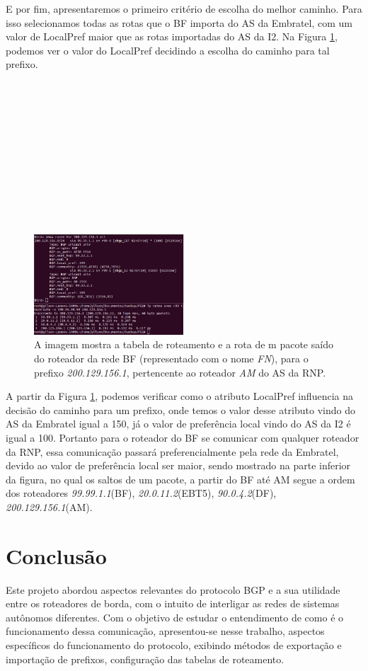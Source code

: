 \documentclass[12pt,a4paper]{report}
\begin{document}
E por fim, apresentaremos o primeiro crit\'erio de escolha do melhor caminho. Para isso selecionamos todas as rotas que o BF importa do AS da Embratel, com um valor de LocalPref maior que as rotas importadas do AS da I2. Na Figura \ref{fig:imagem12}, podemos ver o valor do LocalPref decidindo a escolha do caminho para tal prefixo.
\\
\\
\\
\\
\\
\\
\\
\\
\\
\\
\\
\\
\begin{figure}[!htb]
 \centering
 \includegraphics[width=0.5\textwidth]{Imagens/figura65}
  \caption{\label{fig:imagem12} A imagem mostra a tabela de roteamento e a rota de m pacote sa\'ido do roteador da rede BF (representado com o nome \textit{FN}), para o prefixo \textit{200.129.156.1}, pertencente ao roteador \textit{AM} do AS da RNP.}

\end{figure}

A partir da Figura \ref{fig:imagem12}, podemos verificar como o atributo LocalPref influencia na decis\~ao do caminho para um prefixo, onde temos o valor desse atributo vindo do AS da Embratel igual a 150, j\'a o valor de prefer\^encia local vindo do AS da I2 \'e igual a 100. Portanto para o roteador do BF se comunicar com qualquer roteador da RNP, essa comunica\c{c}\~ao passar\'a preferencialmente pela rede da Embratel, devido ao valor de prefer\^encia local ser maior, sendo mostrado na parte inferior da figura, no qual os saltos de um pacote, a partir do BF at\'e AM segue a ordem dos roteadores \textit{99.99.1.1}(BF), \textit{20.0.11.2}(EBT5), \textit{90.0.4.2}(DF), \textit{200.129.156.1}(AM).

\chapter{Conclus\~ao}
Este projeto abordou aspectos relevantes do protocolo BGP e a sua utilidade entre os roteadores de borda, com o intuito de interligar as redes de sistemas aut\^onomos diferentes. Com o objetivo de estudar o entendimento de como \'e o funcionamento dessa comunica\c{c}\~ao, apresentou-se nesse trabalho, aspectos espec\'ificos do funcionamento do protocolo, exibindo m\'etodos de exporta\c{c}\~ao e importa\c{c}\~ao de prefixos, configura\c{c}\~ao das tabelas de roteamento.
\end{document}

